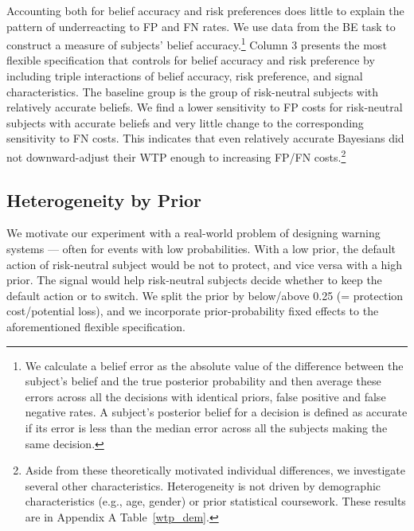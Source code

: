 \documentclass[12pt,a4paper]{article}
\begin{document}
Accounting both for belief accuracy and risk preferences does little to explain the pattern of underreacting to FP and FN rates. We use data from the BE task to construct a measure of subjects' belief accuracy.\footnote{We calculate a belief error as the absolute value of the difference between the subject's belief and the true posterior probability and then average these errors across all the decisions with identical priors, false positive and false negative rates. A subject's posterior belief for a decision is defined as accurate if its error is less than the median error across all the subjects making the same decision.} Column 3 presents the most flexible specification that controls for belief accuracy and risk preference by including triple interactions of belief accuracy, risk preference, and signal characteristics. The baseline group is the group of risk-neutral subjects with relatively accurate beliefs. We find a lower sensitivity to FP costs for risk-neutral subjects with accurate beliefs and very little change to the corresponding sensitivity to FN costs. This indicates that even relatively accurate Bayesians did not downward-adjust their WTP enough to increasing FP/FN costs.\footnote{Aside from these theoretically motivated individual differences, we investigate several other characteristics. Heterogeneity is not driven by demographic characteristics (e.g., age, gender) or prior statistical coursework.  These results are in Appendix A Table~\ref{wtp_dem}.}
  

\subsection{Heterogeneity by Prior}

We motivate our experiment with a real-world problem of designing warning systems --- often for events with low probabilities. With a low prior, the default action of risk-neutral subject would be not to protect, and vice versa with a high prior. The signal would help risk-neutral subjects decide whether to keep the default action or to switch. We split the prior by below/above 0.25 (= protection cost/potential loss), and we incorporate prior-probability fixed effects to the aforementioned flexible specification. 
\end{document}
